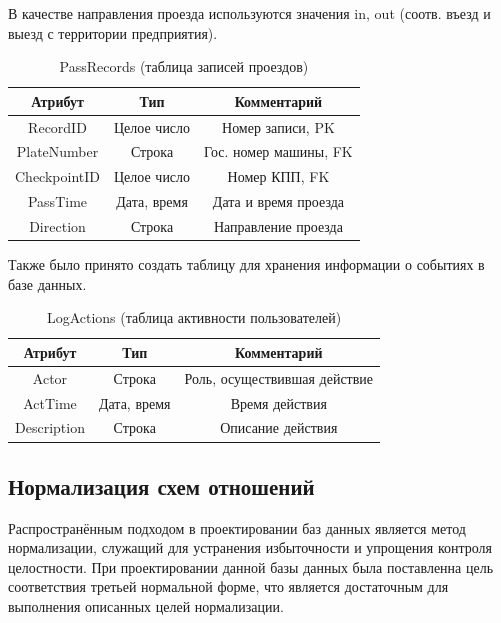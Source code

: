В качестве направления проезда используются значения in, out (соотв. въезд и выезд с территории предприятия).
\newpage
\begin{table}[h!] 
	\begin{center}
		\caption{PassRecords (таблица записей проездов)}
		\label{pass_table}
		\begin{tabular}{| c | c | c |}
			\hline
			\textbf{Атрибут}		&	\textbf{Тип}		& \textbf{Комментарий} \\
			\hline
			RecordID	&	Целое число	&	Номер записи, PK \\ \hline
			PlateNumber	&	Строка		&	Гос. номер машины, FK \\ \hline
			CheckpointID &	Целое число	&	Номер КПП, FK \\ \hline
			PassTime 	&	Дата, время	&	Дата и время проезда \\ \hline
			Direction 	&	Строка		&	Направление проезда \\ \hline
		\end{tabular}
	\end{center}
\end{table}

Также было принято создать таблицу для хранения информации о событиях в базе данных.
\begin{table}[h!] 
	\begin{center}
		\caption{LogActions (таблица активности пользователей)}
		\label{pass_table}
		\begin{tabular}{| c | c | c |}
			\hline
			\textbf{Атрибут}		&	\textbf{Тип}		& \textbf{Комментарий} \\
			\hline
			Actor	&	Строка	&	Роль, осуществившая действие \\ \hline
			ActTime	&	Дата, время		&	Время действия \\ \hline
			Description &	Строка	&	Описание действия \\ \hline
		\end{tabular}
	\end{center}
\end{table}

\subsection{Нормализация схем отношений}
Распространённым подходом в проектировании баз данных является метод нормализации, служащий для устранения избыточности и упрощения контроля целостности. При проектировании данной базы данных была поставленна цель соответствия третьей нормальной форме, что является достаточным для выполнения описанных целей нормализации\cite{norm_db}.

